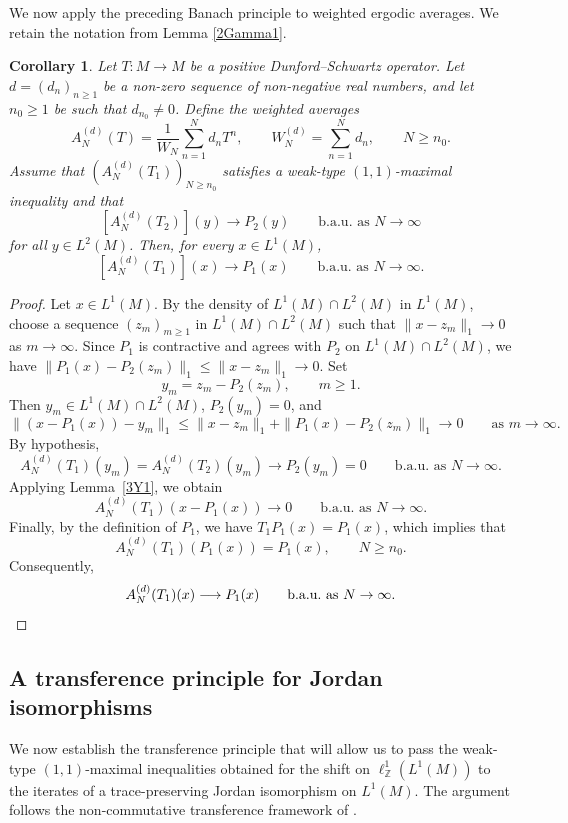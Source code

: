 \documentclass[12pt]{amsart}
\newtheorem{corollary}[theorem]{Corollary}
\theoremstyle{remark}
\theoremstyle{definition}
\numberwithin{equation}{section}
\begin{document}
We now apply the preceding Banach principle to weighted ergodic averages. We retain the notation from Lemma \ref{2Gamma1}.

\begin{corollary}\label{3Y2}
Let $T\colon M\to M$ be a positive Dunford--Schwartz operator. Let
$d=(d_n)_{n\geq1}$ be a non-zero sequence of non-negative real numbers,
and let $n_0\geq1$ be such that $d_{n_0}\neq0$. Define the weighted
averages
\[
A_N^{(d)}(T)=\frac{1}{W_N}\sum_{n=1}^N d_nT^n,
\qquad
W_N^{(d)}=\sum_{n=1}^N d_n,
\qquad N\geq n_0.
\]
Assume that $(A_N^{(d)}(T_1))_{N\geq n_0}$ satisfies a weak-type
$(1,1)$-maximal inequality and that
\[
[A_N^{(d)}(T_2)](y)\longrightarrow P_2(y)
\qquad\text{b.a.u.\ as }N\to\infty
\]
for all $y\in L^2(M)$. Then, for every $x\in L^1(M)$,
\[
[A_N^{(d)}(T_1)](x)\longrightarrow P_1(x)
\qquad\text{b.a.u.\ as }N\to\infty.
\]
\end{corollary}



\begin{proof}
Let $x\in L^1(M)$. By the density of $L^1(M)\cap L^2(M)$ in $L^1(M)$, choose a sequence $(z_m)_{m\geq1}$ in $L^1(M)\cap L^2(M)$ such that $\|x-z_m\|_1\to0$ as $m\to\infty$. Since $P_1$ is contractive and agrees with $P_2$ on $L^1(M)\cap L^2(M)$, we have $\|P_1(x)-P_2(z_m)\|_1\leq\|x-z_m\|_1\to0$. Set
\[
y_m = z_m - P_2(z_m),\qquad m\geq 1.
\]
Then $y_m\in L^1(M)\cap L^2(M)$, $P_2(y_m)=0$, and
\[
\|(x-P_1(x))-y_m\|_1
\leq\|x-z_m\|_1+\|P_1(x)-P_2(z_m)\|_1
\longrightarrow0 \qquad \text{as } m\to\infty.
\]
By hypothesis, \[A_N^{(d)}(T_1)(y_m)=A_N^{(d)}(T_2)(y_m)\longrightarrow P_2(y_m)=0
\qquad\text{b.a.u.\ as }N\to\infty.\] Applying Lemma~\ref{3Y1}, we obtain
\[
A_N^{(d)}(T_1)(x-P_1(x))\longrightarrow0
\qquad\text{b.a.u.\ as }N\to\infty.
\]
Finally, by the definition of $P_1$,
we have  \(T_1 P_1(x)=P_1(x)\), which implies 
that 
$$
A_N^{(d)}(T_1)(P_1(x))=P_1(x),
\qquad N\geq n_0.
$$
Consequently, 
\[
A_N^{(d)}(T_1)(x)\longrightarrow P_1(x)
\qquad\text{b.a.u.\ as }N\to\infty.\qedhere
\]
\end{proof}


\subsection{A transference principle for Jordan isomorphisms}\label{sec:transference}

We now establish the transference principle that will allow us to pass the weak-type $(1,1)$-maximal inequalities obtained for the shift on $\ell^1_{\mathbb Z}(L^1(M))$ to the iterates of a trace-preserving Jordan isomorphism on $L^1(M)$. The argument follows the non-commutative transference framework of \cite{HLW}.
\end{document}
